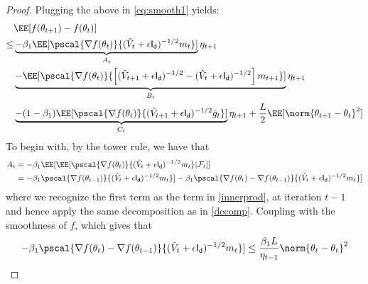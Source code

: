 \documentclass[11pt]{article}
\begin{document}
\begin{proof}
Plugging the above in \eqref{eq:smooth1} yields:
\begin{equation}\label{eq:main1}
\begin{split}
&\EE[f(\theta_{t+1}) - f(\theta_{t}) ] \\
\leq & \underbrace{- \beta_1\EE[ \pscal{\nabla f(\theta_t)}{(\hat{V}_{t} + \epsilon \mathsf{I_d})^{-1/2} m_{t}}]}_{A_t} \eta_{t+1}\\
& \underbrace{-  \EE[\pscal{\nabla f(\theta_t)}{\left[(\hat{V}_{t+1} + \epsilon \mathsf{I_d})^{-1/2} - (\hat{V}_{t} + \epsilon \mathsf{I_d})^{-1/2}  \right]m_{t+1}}]}_{B_t}\eta_{t+1}\\
& \underbrace{-  (1-\beta_1) \EE[\pscal{\nabla f(\theta_t)}{(\hat{V}_{t+1} + \epsilon \mathsf{I_d})^{-1/2} \bar{g}_t}]}_{C_t} \eta_{t+1}+ \frac{L}{2} \EE[\norm{\theta_{t+1} - \theta_{t}}^2]
\end{split}
\end{equation}
To begin with, by the tower rule, we have that 
\begin{align}
A_t & = - \beta_1\EE[\EE[\pscal{\nabla f(\theta_t)}{(\hat{V}_{t} + \epsilon \mathsf{I_d})^{-1/2} m_{t}}| \mathcal{F}_t]] \\
& = - \beta_1 \pscal{\nabla f(\theta_{t-1})}{(\hat{V}_{t} + \epsilon \mathsf{I_d})^{-1/2} m_{t}}] - \beta_1 \pscal{\nabla f(\theta_t) - \nabla f(\theta_{t-1})}{(\hat{V}_{t} + \epsilon \mathsf{I_d})^{-1/2} m_{t}}]\\
\end{align}
where we recognize the first term as the term in \eqref{innerprod}, at iteration $t-1$ and hence apply the same decomposition as in \eqref{decomp}.
Coupling with the smoothness of $f$, which gives that
$$
- \beta_1 \pscal{\nabla f(\theta_t) - \nabla f(\theta_{t-1})}{(\hat{V}_{t} + \epsilon \mathsf{I_d})^{-1/2} m_{t}}] \leq \frac{\beta_1 L}{\eta_{t-1}} \norm{\theta_t - \theta_{t}}^2
$$


\end{proof}
\end{document}
